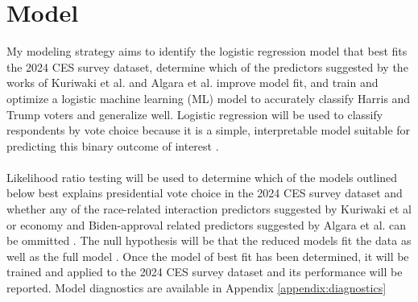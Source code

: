 \documentclass[letter]{article}
\begin{document}
\section{Model} \label{sec:model}
My modeling strategy aims to identify the logistic regression model that best fits the 2024 CES survey dataset, determine which of the predictors suggested by the works of Kuriwaki et al. and Algara et al. improve model fit, and train and optimize a logistic machine learning (ML) model to accurately classify Harris and Trump voters and generalize well. Logistic regression will be used to classify respondents by vote choice because it is a simple, interpretable model suitable for predicting this binary outcome of interest \cite{camatarri}.\\
\\
Likelihood ratio testing will be used to determine which of the models outlined below best explains presidential vote choice in the 2024 CES survey dataset and whether any of the race-related interaction predictors suggested by Kuriwaki et al or economy and Biden-approval related predictors suggested by Algara et al. can be ommitted \cite{kuriwaki} \cite{algara}. The null hypothesis will be that the reduced models fit the data as well as the full model \cite{lrt-wikipedia}. Once the model of best fit has been determined, it will be trained and applied to the 2024 CES survey dataset and its performance will be reported. Model diagnostics are available in Appendix \ref{appendix:diagnostics} \\
\\
\end{document}
